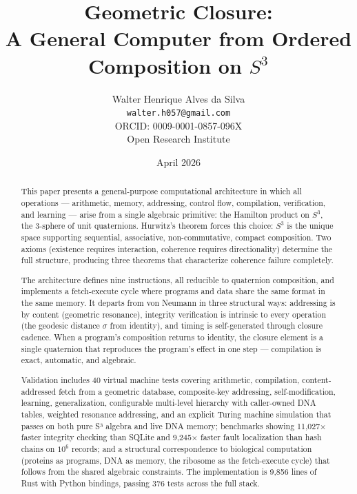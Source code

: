 \documentclass[12pt,a4paper]{article}
\title{Geometric Closure:\\A General Computer from Ordered Composition on $S^3$}
\author{
Walter Henrique Alves da Silva\\
\texttt{walter.h057@gmail.com}\\
ORCID: 0009-0001-0857-096X\\[6pt]
Open Research Institute
}
\date{April 2026}
\begin{document}
\maketitle

\begin{abstract}
This paper presents a general-purpose computational architecture in which all operations --- arithmetic, memory, addressing, control flow, compilation, verification, and learning --- arise from a single algebraic primitive: the Hamilton product on $S^3$, the 3-sphere of unit quaternions. Hurwitz's theorem forces this choice: $S^3$ is the unique space supporting sequential, associative, non-commutative, compact composition. Two axioms (existence requires interaction, coherence requires directionality) determine the full structure, producing three theorems that characterize coherence failure completely.

The architecture defines nine instructions, all reducible to quaternion composition, and implements a fetch-execute cycle where programs and data share the same format in the same memory. It departs from von Neumann in three structural ways: addressing is by content (geometric resonance), integrity verification is intrinsic to every operation (the geodesic distance $\sigma$ from identity), and timing is self-generated through closure cadence. When a program's composition returns to identity, the closure element is a single quaternion that reproduces the program's effect in one step --- compilation is exact, automatic, and algebraic.

Validation includes 40 virtual machine tests covering arithmetic, compilation, content-addressed fetch from a geometric database, composite-key addressing, self-modification, learning, generalization, configurable multi-level hierarchy with caller-owned DNA tables, weighted resonance addressing, and an explicit Turing machine simulation that passes on both pure S³ algebra and live DNA memory; benchmarks showing 11,027$\times$ faster integrity checking than SQLite and 9,245$\times$ faster fault localization than hash chains on $10^6$ records; and a structural correspondence to biological computation (proteins as programs, DNA as memory, the ribosome as the fetch-execute cycle) that follows from the shared algebraic constraints. The implementation is 9,856 lines of Rust with Python bindings, passing 376 tests across the full stack.
\end{abstract}


\end{document}
